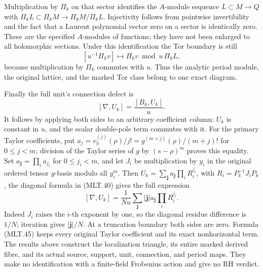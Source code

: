 Multiplication by \(\Pi_k\) on that
sector identifies the \(A\)-module
sequence \(L\subset M\to Q\) with
\(\Pi_kL\subset\Pi_kM\to\Pi_kM/\Pi_kL\).
Injectivity follows from pointwise
invertibility and the fact that
a Laurent polynomial vector zero
on a sector is identically zero.
These are the specified
\(A\)-modules of functions;
they have not been enlarged
to all holomorphic sections.
Under this identification the
Tor boundary is still
\[
 [u^{-1}\Pi_k v]\longmapsto
       \Pi_k v\bmod u\,\Pi_k L,                           \tag{MLT.43}
\]
because multiplication by \(\Pi_k\)
commutes with \(u\). Thus the
analytic period module, the
original lattice, and the marked
Tor class belong to one exact
diagram.

Finally the full unit's connection
defect is
\[
 [\nabla,U_k]=\frac{[B_k,U_k]}{u}.
                                                               \tag{MLT.44}
\]
It follows by applying both sides
to an arbitrary coefficient column:
\(U_k\) is constant in \(u\),
and the scalar double-pole term
commutes with it.
For the primary Taylor coefficients,
put \(a_j=v_h^{(j)}(\rho)/j!
=g^{(m+j)}(\rho)/(m+j)!\) for
\(0\le j<m\); division of the
Taylor series of \(g\) by
\((s-\rho)^m\) proves this equality.
Set \(a_{\mathbf j}=\prod_i a_{j_i}\)
for \(0\le j_i<m\), and let \(J_i\)
be multiplication by \(y_i\) in
the original ordered tensor
\(y\)-basis modulo all \(y_i^m\).
Then \(U_k=\sum_{\mathbf j}a_{\mathbf j}
\prod_iR_i^{j_i}\), with
\(R_i=P_k^{-1}J_iP_k\),
the diagonal formula in (MLT.40)
gives the full expression
\[
 [\nabla,U_k]
   =\frac1{Nu}\sum_{\mathbf j}
       |\mathbf j|a_{\mathbf j}
                   \prod_iR_i^{j_i}.                    \tag{MLT.45}
\]
Indeed \(J_i\) raises the \(i\)-th
exponent by one, so the diagonal
residue difference is \(1/N\);
iteration gives \(|\mathbf j|/N\).
At a truncation boundary both
sides are zero. Formula (MLT.45)
keeps every original Taylor
coefficient and its exact
nonhorizontal term.
The results above construct the
localization triangle, its entire
marked derived fibre, and its
actual source, support, unit,
connection, and period maps.
They make no identification
with a finite-field Frobenius
action and give no RH verdict.
